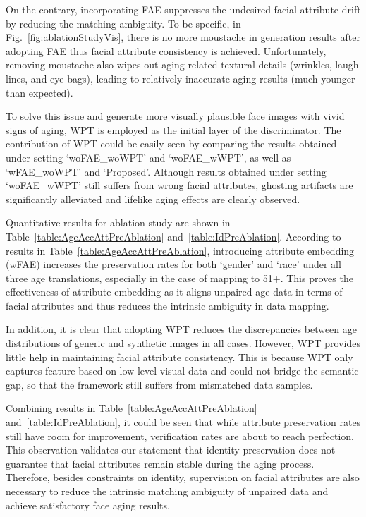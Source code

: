 \documentclass[10pt,twocolumn,letterpaper]{article}
\begin{document}
On the contrary, incorporating FAE suppresses the undesired facial attribute drift by reducing the matching ambiguity.
To be specific, in Fig.~\ref{fig:ablationStudyVis}, there is no more moustache in generation results after adopting FAE thus facial attribute consistency is achieved. 
Unfortunately, removing moustache also wipes out aging-related textural details (wrinkles, laugh lines, and eye bags), leading to relatively inaccurate aging results (much younger than expected).

To solve this issue and generate more visually plausible face images with vivid signs of aging, WPT is employed as the initial layer of the discriminator. 
The contribution of WPT could be easily seen by comparing the results obtained under setting `woFAE{\_}woWPT' and `woFAE{\_}wWPT', as well as `wFAE{\_}woWPT' and `Proposed'. 
Although results obtained under setting `woFAE{\_}wWPT' still suffers from wrong facial attributes, ghosting artifacts are significantly alleviated and lifelike aging effects are clearly observed. 

Quantitative results for ablation study are shown in Table~\ref{table:AgeAccAttPreAblation} and~\ref{table:IdPreAblation}.
According to results in Table~\ref{table:AgeAccAttPreAblation}, introducing attribute embedding (wFAE) increases the preservation rates for both `gender' and `race' under all three age translations, especially in the case of mapping to 51+. 
This proves the effectiveness of attribute embedding as it aligns unpaired age data in terms of facial attributes and thus reduces the intrinsic ambiguity in data mapping. 

In addition, it is clear that adopting WPT reduces the discrepancies between age distributions of generic and synthetic images in all cases. 
However, WPT provides little help in maintaining facial attribute consistency.
This is because WPT only captures feature based on low-level visual data and could not bridge the semantic gap, so that the framework still suffers from mismatched data samples.

Combining results in Table~\ref{table:AgeAccAttPreAblation} and~\ref{table:IdPreAblation}, it could be seen that while attribute preservation rates still have room for improvement, verification rates are about to reach perfection.
This observation validates our statement that identity preservation does not guarantee that facial attributes remain stable during the aging process.
Therefore, besides constraints on identity, supervision on facial attributes are also necessary to reduce the intrinsic matching ambiguity of unpaired data and achieve satisfactory face aging results.
\end{document}
